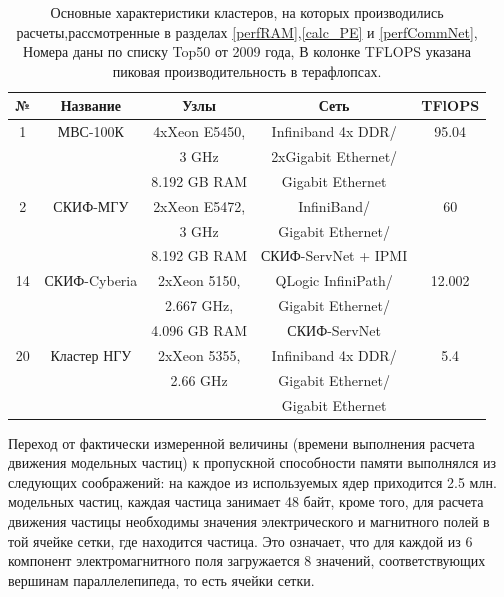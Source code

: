 \begin{table}[ht]
\caption{
Основные характеристики кластеров, на которых производились расчеты,рассмотренные в разделах \ref{perfRAM},\ref{calc_PE} и \ref{perfCommNet}, Номера даны по списку Top50 от 2009 года, В колонке TFLOPS указана пиковая производительность в терафлопсах.}
	\begin{center}
		\begin{tabular}{|c|c|c|c|c|}
			\hline
			№                 & Название & Узлы               & Сеть                                   &  TFlOPS\\
		          \hline 
			1                & МВС-100К & 4xXeon E5450,      &  Infiniband 4x DDR/                    & 95.04 \\
			&          & 3 GHz              &  2xGigabit Ethernet/                   &       \\
			&          & 8.192 GB RAM       &  Gigabit Ethernet                      &    \\ \hline 
			2                 & СКИФ-МГУ & 2xXeon E5472,      & InfiniBand/                             & 60   \\
			&          &   3 GHz            & Gigabit Ethernet/                       &      \\
			&          &  8.192 GB RAM      & СКИФ-ServNet + IPMI                    &   \\ \hline 
			14                & СКИФ-Cyberia & 2xXeon 5150,   &  QLogic InfiniPath/                     & 12.002 \\
			&              &  2.667 GHz,    & Gigabit Ethernet/                       &   \\
			&           &     4.096 GB RAM  & СКИФ-ServNet                            & \\ \hline 
			20                & Кластер НГУ & 2xXeon 5355,    &  Infiniband 4x DDR/                    & 5.4 \\ 
			&           & 2.66 GHz          &   Gigabit Ethernet/                    &  \\
			&           &                   &   Gigabit Ethernet                     &  \\ \hline 
			
		\end{tabular}
	\end{center}

	\label{top50_2010}
\end{table}

Переход от фактически измеренной величины (времени выполнения расчета движения модельных частиц) к пропускной способности памяти выполнялся из следующих соображений: на каждое из используемых ядер приходится 2.5 млн. модельных частиц, каждая частица занимает 48 байт, кроме того, для расчета движения частицы необходимы значения электрического и магнитного полей в той ячейке сетки, где находится частица. Это означает, что для каждой из 6 компонент электромагнитного поля загружается 8 значений, соответствующих вершинам параллелепипеда, то есть ячейки сетки. 

